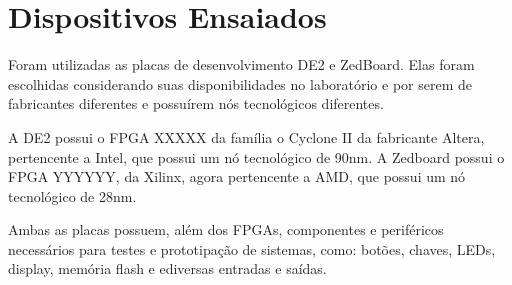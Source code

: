 \section{Dispositivos Ensaiados}

Foram utilizadas as placas de desenvolvimento DE2 e ZedBoard. Elas foram escolhidas considerando suas disponibilidades no laboratório e por serem de fabricantes diferentes e possuírem nós tecnológicos diferentes.

A DE2 possui o FPGA XXXXX da família o Cyclone II da fabricante Altera, pertencente a Intel, que possui um nó tecnológico de 90nm. A Zedboard possui o FPGA YYYYYY, da Xilinx, agora pertencente a AMD, que possui um nó tecnológico de 28nm.

Ambas as placas possuem, além dos FPGAs, componentes e periféricos necessários para testes e prototipação de sistemas, como: botões, chaves, LEDs, display, memória flash e ediversas entradas e saídas.